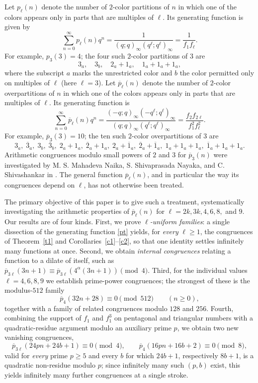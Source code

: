 \documentclass[11pt, reqno]{amsart}
\numberwithin{equation}{section}
\begin{document}
	\noindent Let $p_\ell(n)$ denote the number of $2$-color partitions of $n$ in which one of the colors appears only in parts that are multiples of $\ell$. Its generating
	function is given by
	\begin{equation}
		\sum_{n=0}^{\infty} p_\ell(n)q^n
		=
		\frac{1}{(q;q)_\infty (q^\ell;q^\ell)_\infty}=\frac{1}{f_1f_\ell}.
	\end{equation}
	For example, $p_3(3)=4$; the four such $2$-color partitions of $3$ are
	\[
	3_a,\quad 3_b,\quad 2_a+1_a,\quad 1_a+1_a+1_a,
	\]
	where the subscript $a$ marks the unrestricted color and $b$ the color permitted only on multiples of $\ell$ (here $\ell=3$).
	Let $\overline{p}_\ell(n)$ denote the number of $2$-color overpartitions of $n$ in which one of the colors appears only in parts that are multiples of $\ell$. Its generating function is
	\begin{equation}
		\sum_{n=0}^{\infty} \overline{p}_\ell(n)q^n
		=
		\frac{(-q;q)_\infty(-q^\ell;q^\ell)_\infty}
		{(q;q)_\infty(q^\ell;q^\ell)_\infty}=
		\frac{f_2f_{2\ell}}{f_1^2f_\ell^2}.
		\label{pt}
	\end{equation}
	For example, $\overline{p}_3(3)=10$; the ten such $2$-color overpartitions of $3$ are
	\[
	3_a,\;
	\overline{3}_a,\;
	3_b,\;
	\overline{3}_b,\;
	2_a+1_a,\;
	\overline{2}_a+1_a,\;
	2_a+\overline{1}_a,\;
	\overline{2}_a+\overline{1}_a,\;
	1_a+1_a+1_a,\;
	\overline{1}_a+1_a+1_a.
	\]
	Arithmetic congruences modulo small powers of $2$ and $3$ for $\overline{p}_3(n)$ were investigated by M. S. Mahadeva Naika, S. Shivaprasada Nayaka, and C. Shivashankar in \cite{MSMSSNCS}. The general function $\overline{p}_\ell(n)$, and in particular the way its congruences depend on $\ell$, has not otherwise been treated.
	
	The primary objective of this paper is to give such a treatment, systematically investigating the arithmetic properties of $\overline{p}_{\ell}(n)$ for $\ell=2k,3k,4,6,8,$ and $9$. Our results are of four kinds. First, we prove \emph{$\ell$-uniform families}: a single dissection of the generating function \eqref{pt} yields, for \emph{every} $\ell\ge1$, the congruences of Theorem~\ref{t1} and Corollaries~\ref{c1}--\ref{c2}, so that one identity settles infinitely many functions at once. Second, we obtain \emph{internal congruences} relating a function to a dilate of itself, such as $\overline{p}_{3\ell}(3n+1)\equiv\overline{p}_{3\ell}\!\left(4^\alpha(3n+1)\right)\pmod 4$. Third, for the individual values $\ell=4,6,8,9$ we establish prime-power congruences; the strongest of these is the modulus-$512$ family
	\[
	\overline{p}_{4}(32n+28)\equiv0\pmod{512}\qquad(n\ge0),
	\]
	together with a family of related congruences modulo $128$ and $256$. Fourth, combining the support of $f_1$ and $f_1^3$ on pentagonal and triangular numbers with a quadratic-residue argument modulo an auxiliary prime $p$, we obtain two new vanishing congruences,
	\[
	\overline{p}_{3\ell}(24pn+24b+1)\equiv0\pmod4,\qquad
	\overline{p}_{4}(16pn+16b+2)\equiv0\pmod8,
	\]
	valid for \emph{every} prime $p\ge5$ and every $b$ for which $24b+1$, respectively $8b+1$, is a quadratic non-residue modulo $p$; since infinitely many such $(p,b)$ exist, this yields infinitely many further congruences at a single stroke.
	
\end{document}
